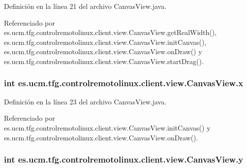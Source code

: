 Definición en la línea 21 del archivo Canvas\-View.\-java.



Referenciado por es.\-ucm.\-tfg.\-controlremotolinux.\-client.\-view.\-Canvas\-View.\-get\-Real\-Width(), es.\-ucm.\-tfg.\-controlremotolinux.\-client.\-view.\-Canvas\-View.\-init\-Canvas(), es.\-ucm.\-tfg.\-controlremotolinux.\-client.\-view.\-Canvas\-View.\-on\-Draw() y es.\-ucm.\-tfg.\-controlremotolinux.\-client.\-view.\-Canvas\-View.\-start\-Drag().

\hypertarget{classes_1_1ucm_1_1tfg_1_1controlremotolinux_1_1client_1_1view_1_1CanvasView_af005a9add4d1ef816049f202ee288195}{
\subsubsection[{x}]{\setlength{\rightskip}{0pt plus 5cm}int es.\-ucm.\-tfg.\-controlremotolinux.\-client.\-view.\-Canvas\-View.\-x\hspace{0.3cm}{\ttfamily [private]}}}\label{classes_1_1ucm_1_1tfg_1_1controlremotolinux_1_1client_1_1view_1_1CanvasView_af005a9add4d1ef816049f202ee288195}


Definición en la línea 23 del archivo Canvas\-View.\-java.



Referenciado por es.\-ucm.\-tfg.\-controlremotolinux.\-client.\-view.\-Canvas\-View.\-init\-Canvas() y es.\-ucm.\-tfg.\-controlremotolinux.\-client.\-view.\-Canvas\-View.\-on\-Draw().

\hypertarget{classes_1_1ucm_1_1tfg_1_1controlremotolinux_1_1client_1_1view_1_1CanvasView_ace7698a28d38fb30045ffd5548036cee}{
\subsubsection[{y}]{\setlength{\rightskip}{0pt plus 5cm}int es.\-ucm.\-tfg.\-controlremotolinux.\-client.\-view.\-Canvas\-View.\-y\hspace{0.3cm}{\ttfamily [private]}}}\label{classes_1_1ucm_1_1tfg_1_1controlremotolinux_1_1client_1_1view_1_1CanvasView_ace7698a28d38fb30045ffd5548036cee}


